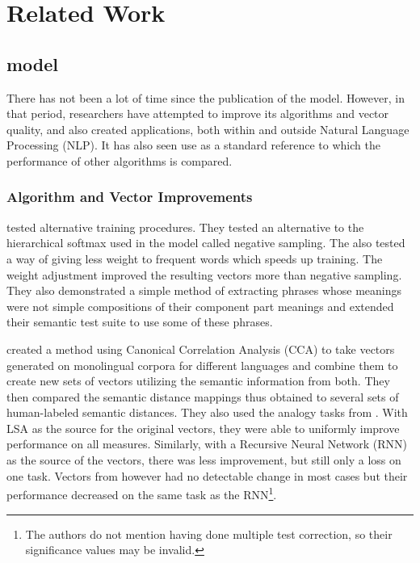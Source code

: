 \chapter{Related Work}

\section{\modelname{} model}

There has not been a lot of time since the publication of the \modelname{} model. 
However, in that period, researchers have attempted to improve its algorithms
and vector quality, and also created applications, both within and outside 
Natural Language Processing (NLP). It has also seen use as a 
standard reference to which the performance of other algorithms is compared.

\subsection{Algorithm and Vector Improvements}

\citep{Mikolov2013c} tested alternative training procedures. They tested an 
alternative to the hierarchical softmax used in the \modelname{} model called 
negative sampling. The also tested a way of giving less weight to frequent words
which speeds up training. The weight adjustment improved the resulting vectors
more than negative sampling. They also demonstrated a simple method
of extracting phrases whose meanings were not simple compositions of their
component part meanings and extended their semantic test suite to use some
of these phrases.

\citep{Faruqui2014} created a method using Canonical Correlation Analysis (CCA) 
to take vectors generated on monolingual corpora for different languages and 
combine them to create new sets of vectors utilizing the semantic information 
from both. They then compared the semantic distance mappings thus obtained to 
several sets of human-labeled semantic distances. They also used the analogy 
tasks from \citep{Mikolov2013a}. With LSA as the source for the original 
vectors, they were able to uniformly improve performance on all measures. 
Similarly, with a Recursive Neural Network (RNN) as the source of the vectors, 
there was less improvement, but still only a loss on one task. Vectors from 
\modelname{} however had no detectable change in most cases but their 
performance decreased on the same task as the RNN\footnote{The authors do not 
mention having done multiple test correction, so their significance values may 
be invalid.}.

